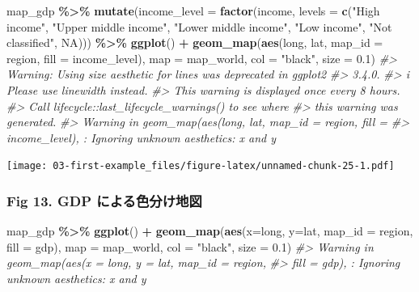 \documentclass[
  xelatex, ja=standard]{bxjsbook}
\newenvironment{Shaded}{\begin{snugshade}}{\end{snugshade}}
\newcommand{\AttributeTok}[1]{\textcolor[rgb]{0.13,0.29,0.53}{#1}}
\newcommand{\CommentTok}[1]{\textcolor[rgb]{0.56,0.35,0.01}{\textit{#1}}}
\newcommand{\ConstantTok}[1]{\textcolor[rgb]{0.56,0.35,0.01}{#1}}
\newcommand{\FloatTok}[1]{\textcolor[rgb]{0.00,0.00,0.81}{#1}}
\newcommand{\FunctionTok}[1]{\textcolor[rgb]{0.13,0.29,0.53}{\textbf{#1}}}
\newcommand{\NormalTok}[1]{#1}
\newcommand{\SpecialCharTok}[1]{\textcolor[rgb]{0.81,0.36,0.00}{\textbf{#1}}}
\newcommand{\StringTok}[1]{\textcolor[rgb]{0.31,0.60,0.02}{#1}}
\theoremstyle{definition}
\theoremstyle{definition}
\theoremstyle{definition}
\theoremstyle{definition}
\theoremstyle{remark}
\begin{document}
\begin{Shaded}
\begin{Highlighting}[]
\NormalTok{map\_gdp }\SpecialCharTok{\%\textgreater{}\%} \FunctionTok{mutate}\NormalTok{(}\AttributeTok{income\_level =} \FunctionTok{factor}\NormalTok{(income, }\AttributeTok{levels =} \FunctionTok{c}\NormalTok{(}\StringTok{"High income"}\NormalTok{, }\StringTok{"Upper middle income"}\NormalTok{, }\StringTok{"Lower middle income"}\NormalTok{, }\StringTok{"Low income"}\NormalTok{, }\StringTok{"Not classified"}\NormalTok{, }\ConstantTok{NA}\NormalTok{))) }\SpecialCharTok{\%\textgreater{}\%}
  \FunctionTok{ggplot}\NormalTok{() }\SpecialCharTok{+}
  \FunctionTok{geom\_map}\NormalTok{(}\FunctionTok{aes}\NormalTok{(long, lat, }\AttributeTok{map\_id =}\NormalTok{ region, }\AttributeTok{fill =}\NormalTok{ income\_level), }\AttributeTok{map =}\NormalTok{ map\_world, }\AttributeTok{col =} \StringTok{"black"}\NormalTok{, }\AttributeTok{size =} \FloatTok{0.1}\NormalTok{) }
\CommentTok{\#\textgreater{} Warning: Using \textasciigrave{}size\textasciigrave{} aesthetic for lines was deprecated in ggplot2}
\CommentTok{\#\textgreater{} 3.4.0.}
\CommentTok{\#\textgreater{} i Please use \textasciigrave{}linewidth\textasciigrave{} instead.}
\CommentTok{\#\textgreater{} This warning is displayed once every 8 hours.}
\CommentTok{\#\textgreater{} Call \textasciigrave{}lifecycle::last\_lifecycle\_warnings()\textasciigrave{} to see where}
\CommentTok{\#\textgreater{} this warning was generated.}
\CommentTok{\#\textgreater{} Warning in geom\_map(aes(long, lat, map\_id = region, fill =}
\CommentTok{\#\textgreater{} income\_level), : Ignoring unknown aesthetics: x and y}
\end{Highlighting}
\end{Shaded}

\texttt{[image: 03-first-example\_files/figure-latex/unnamed-chunk-25-1.pdf]}

\hypertarget{fig-13.-gdp-ux306bux3088ux308bux8272ux5206ux3051ux5730ux56f3}{%
\subsubsection{Fig 13. GDP による色分け地図}\label{fig-13.-gdp-ux306bux3088ux308bux8272ux5206ux3051ux5730ux56f3}}

\begin{Shaded}
\begin{Highlighting}[]
\NormalTok{map\_gdp }\SpecialCharTok{\%\textgreater{}\%}
  \FunctionTok{ggplot}\NormalTok{() }\SpecialCharTok{+}
  \FunctionTok{geom\_map}\NormalTok{(}\FunctionTok{aes}\NormalTok{(}\AttributeTok{x=}\NormalTok{long, }\AttributeTok{y=}\NormalTok{lat, }\AttributeTok{map\_id =}\NormalTok{ region, }\AttributeTok{fill =}\NormalTok{ gdp), }\AttributeTok{map =}\NormalTok{ map\_world, }\AttributeTok{col =} \StringTok{"black"}\NormalTok{, }\AttributeTok{size =} \FloatTok{0.1}\NormalTok{) }
\CommentTok{\#\textgreater{} Warning in geom\_map(aes(x = long, y = lat, map\_id = region,}
\CommentTok{\#\textgreater{} fill = gdp), : Ignoring unknown aesthetics: x and y}
\end{Highlighting}
\end{Shaded}
\end{document}

